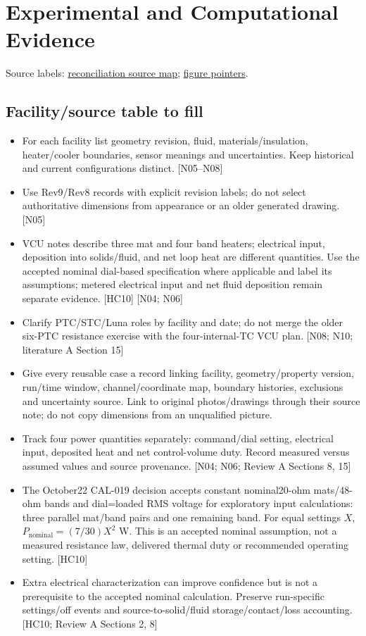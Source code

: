 \section{Experimental and Computational Evidence}
\noindent\small Source labels: \href{run:doc_support/reconciliation/2026-11-02/SOURCES.md}{reconciliation source map}; \href{run:doc_support/reconciliation/2026-11-02/FIGURE_POINTERS.md}{figure pointers}.\normalsize

\subsection{Facility/source table to fill}
\begin{itemize}[leftmargin=*]
\item For each facility list geometry revision, fluid, materials/insulation, heater/cooler boundaries, sensor meanings and uncertainties. Keep historical and current configurations distinct. [N05--N08]
\item Use Rev9/Rev8 records with explicit revision labels; do not select authoritative dimensions from appearance or an older generated drawing. [N05]
\item VCU notes describe three mat and four band heaters; electrical input, deposition into solids/fluid, and net loop heat are different quantities. Use the accepted nominal dial-based specification where applicable and label its assumptions; metered electrical input and net fluid deposition remain separate evidence. [HC10] [N04; N06]
\item Clarify PTC/STC/Luna roles by facility and date; do not merge the older six-PTC resistance exercise with the four-internal-TC VCU plan. [N08; N10; literature A Section 15]
\item Give every reusable case a record linking facility, geometry/property version, run/time window, channel/coordinate map, boundary histories, exclusions and uncertainty source. Link to original photos/drawings through their source note; do not copy dimensions from an unqualified picture.
\item Track four power quantities separately: command/dial setting, electrical input, deposited heat and net control-volume duty. Record measured versus assumed values and source provenance. [N04; N06; Review A Sections 8, 15]\cite{jcgm2020measurementmodels}
\item The October22 CAL-019 decision accepts constant nominal20-ohm mats/48-ohm bands and dial=loaded RMS voltage for exploratory input calculations: three parallel mat/band pairs and one remaining band. For equal settings $X$, $P_{\mathrm{nominal}}=(7/30)X^2$ W. This is an accepted nominal assumption, not a measured resistance law, delivered thermal duty or recommended operating setting. [HC10]
\item Extra electrical characterization can improve confidence but is not a prerequisite to the accepted nominal calculation. Preserve run-specific settings/off events and source-to-solid/fluid storage/contact/loss accounting. [HC10; Review A Sections 2, 8]
\end{itemize}

